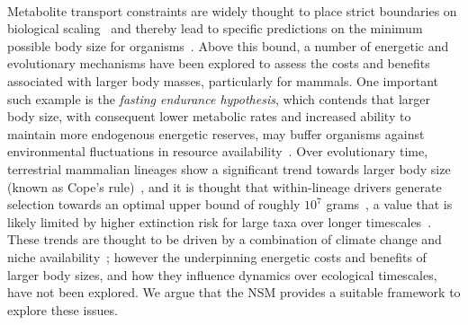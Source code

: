 \documentclass[11pt]{article}
\begin{document}
\begin{multicols}{2}
 \\
Metabolite transport constraints are widely thought to place strict boundaries on biological scaling~\cite{Brown:1993p708,West:1997cg,Brown:2004wq} and thereby lead to specific predictions on the minimum possible body size for organisms~\cite{West:2002ud}.  
Above this bound, a number of energetic and evolutionary mechanisms have been explored to assess the costs and benefits associated with larger body masses, particularly for mammals.  
One important such example is the \emph{fasting endurance hypothesis}, which contends that larger body size, with consequent lower metabolic rates and increased ability to maintain more endogenous energetic reserves, may buffer organisms against environmental fluctuations in resource availability~\cite{Millar:1990p923}. 
Over evolutionary time, terrestrial mammalian lineages show a significant trend towards larger body size (known as Cope's rule)~\cite{Alroy:1998p1594,Clauset:2009fh,Smith:2010p3442,Saarinen:2014br}, and it is thought that within-lineage drivers generate selection towards an optimal upper bound of roughly $10^7$ grams~\cite{Alroy:1998p1594}, a value that is likely limited by higher extinction risk for large taxa over longer timescales~\cite{Clauset:2009fh}.  
These trends are thought to be driven by a combination of climate change and niche availability~\cite{Saarinen:2014br}; however the underpinning energetic costs and benefits of larger body sizes, and how they influence dynamics over ecological timescales, have not been explored.  
We argue that the NSM provides a suitable framework to explore these issues.



\end{multicols}
\end{document}
